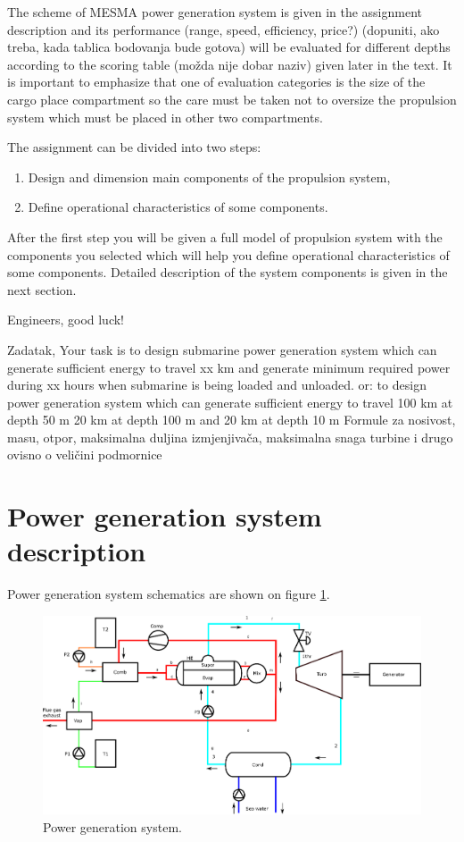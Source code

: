 \documentclass{article}
\begin{document}
	The scheme of MESMA power generation system is given in the assignment description and its performance (range, speed, efficiency, price?) (dopuniti, ako treba, kada tablica bodovanja bude gotova) will be evaluated for different depths according to the scoring table (možda nije dobar naziv) given later in the text. It is important to emphasize that one of evaluation categories is the size of the cargo place compartment so the care must be taken not to oversize the propulsion system which must be placed in other two compartments.
	
	The assignment can be divided into two steps: 
	
	\begin{enumerate}
		\item Design and dimension main components of the propulsion system,
		\item Define operational characteristics of some components.
	\end{enumerate}

	After the first step you will be given a full model of propulsion system with the components you selected which will help you define operational characteristics of some components.
	Detailed description of the system components is given in the next section.
	
	Engineers, good luck!
	
	Zadatak,
	Your task is to design submarine power generation system which can generate sufficient energy to travel xx km and generate minimum required power during xx hours when submarine is being loaded and unloaded.
	or: to design power generation system which can generate sufficient energy to travel 100 km at depth 50 m 20 km at depth  100 m and 20 km at depth 10 m
	Formule za nosivost, masu, otpor, maksimalna duljina izmjenjivača, maksimalna snaga turbine i drugo ovisno o veličini podmornice
		
		
	\section{Power generation system description}
	
	Power generation system schematics are shown on figure \ref{fig:pwr_scheme}.
	
	\begin{figure}[h!]
		\centering
		\includegraphics[width=\textwidth]{Thermodynamics/pwr_system.png}
		\caption{Power generation system.}
		\label{fig:pwr_scheme}
	\end{figure}
	
\end{document}
